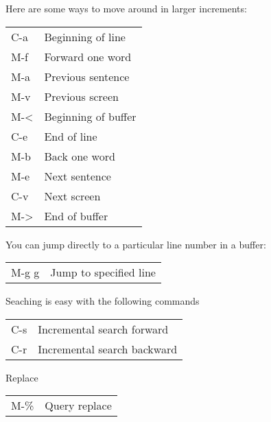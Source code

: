 Here are some ways to move around in larger increments:

\noindent\begin{tabulary}{\linewidth}{|L|L|}
\hline
{}\relax &\relax \\
\hline
C-a
&
Beginning of line
\\
\hline
M-f
&
Forward one word
\\
\hline
M-a
&
Previous sentence
\\
\hline
M-v
&
Previous screen
\\
\hline
M-\textless{}
&
Beginning of buffer
\\
\hline
C-e
&
End of line
\\
\hline
M-b
&
Back one word
\\
\hline
M-e
&
Next sentence
\\
\hline
C-v
&
Next screen
\\
\hline
M-\textgreater{}
&
End of buffer
\\
\hline\end{tabulary}


You can jump directly to a particular line number in a buffer:

\noindent\begin{tabulary}{\linewidth}{|L|L|}
\hline
{}\relax &\relax \\
\hline
M-g g
&
Jump to specified line
\\
\hline\end{tabulary}


Seaching is easy with the following commands

\noindent\begin{tabulary}{\linewidth}{|L|L|}
\hline
{}\relax &\relax \\
\hline
C-s
&
Incremental search forward
\\
\hline
C-r
&
Incremental search backward
\\
\hline\end{tabulary}


Replace

\noindent\begin{tabulary}{\linewidth}{|L|L|}
\hline
{}\relax &\relax \\
\hline
M-\%
&
Query replace
\\
\hline\end{tabulary}



